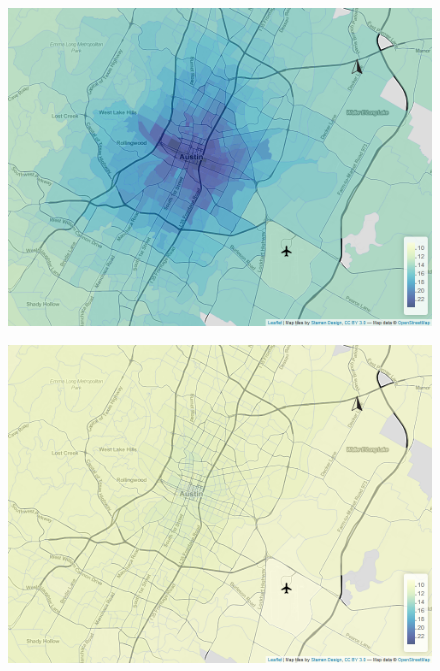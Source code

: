 \documentclass[a4paper, 11pt]{article}
\begin{document}
\begin{figure}[tb]
    \centering
    \begin{minipage}[tb]{0.48\linewidth}
        \centering
        \includegraphics[width=\linewidth]{img/quantile_9_1.png}
        \label{fig:quantiles:0.1:a}
    \end{minipage}
    \begin{minipage}[tb]{0.48\linewidth}
        \centering
        \includegraphics[width=\linewidth]{img/quantile_43_1.png}
        \label{fig:quantiles:0.1:b}
    \end{minipage}\hfill
    \begin{minipage}[tb]{.48\linewidth}

\end{minipage}
\end{figure}
\end{document}
